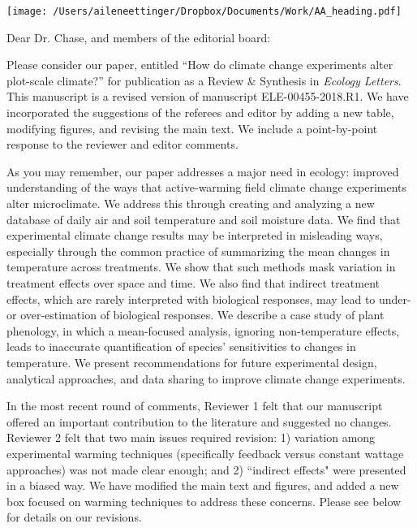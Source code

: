 \documentclass[11pt,a4paper]{letter}
\begin{document}


\begin{letter}{}
\texttt{[image: /Users/aileneettinger/Dropbox/Documents/Work/AA\_heading.pdf]}

\opening{Dear Dr. Chase, and members of the editorial board:}
Please consider our paper, entitled ``How do climate change experiments alter plot-scale climate?'' for publication as a Review \& Synthesis in \emph{Ecology Letters}. This manuscript is a revised version of manuscript  ELE-00455-2018.R1. We have incorporated the suggestions of the referees and editor by adding a new table, modifying figures, and revising the main text. We include a point-by-point response to the reviewer and editor comments. 

As you may remember, our paper addresses a major need in ecology: improved understanding of the ways that active-warming field climate change experiments alter microclimate. We address this through creating and analyzing a new database of daily air and soil temperature and soil moisture data.  We find that experimental climate change results may be interpreted in misleading ways, especially through the common practice of summarizing the mean changes in temperature across treatments.  We show that such methods mask variation in treatment effects over space and time. We also find that indirect treatment effects, which are rarely interpreted with biological responses, may lead to under- or over-estimation of biological responses. We describe a case study of plant phenology, in which a mean-focused analysis, ignoring non-temperature effects, leads to inaccurate quantification of species' sensitivities to changes in temperature. We present recommendations for future experimental design, analytical approaches, and data sharing to improve climate change experiments.

In the most recent round of comments, Reviewer 1 felt that our manuscript offered an important contribution to the literature and suggested no changes. Reviewer 2 felt that two main issues required revision: 1) variation among experimental warming techniques (specifically feedback versus constant wattage approaches) was not made clear enough; and 2) ``indirect effects" were presented in a biased way.  We have modified the main text and figures, and added a new box focused on warming techniques to address these concerns. Please see below for details on our revisions.  


\end{letter}
\end{document}
